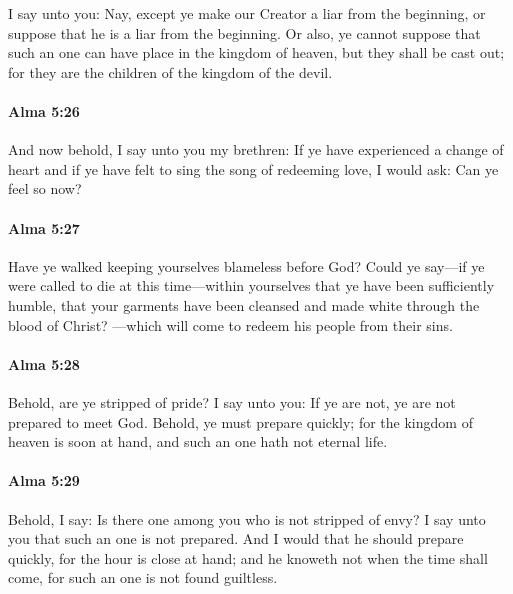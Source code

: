 			I say unto you:
			Nay, except ye make our Creator a liar from the beginning,
			or suppose that he is a liar from the beginning.
			Or also, ye cannot suppose
			that such an one can have place in the kingdom of heaven,
			but they shall be cast out;
			for they are the children of the kingdom of the devil.

		\paragraph{Alma 5:26} %
			\label{ALMA-5-26}

			And now behold, I say unto you my brethren:
			If ye have experienced a change of heart
			and if ye have felt to sing the song of redeeming love,
			I would ask:
			Can ye feel so now?

		\paragraph{Alma 5:27} %
			\label{ALMA-5-27}

			Have ye walked keeping yourselves blameless before God?
			Could ye say---if ye were called to die at this time---within yourselves
			that ye have been sufficiently humble,
			that your garments have been cleansed
			and made white through the blood of Christ?
			---which will come to redeem his people from their sins.

		\paragraph{Alma 5:28} %
			\label{ALMA-5-28}

			Behold, are ye stripped of pride?
			I say unto you:
			If ye are not, ye are not prepared to meet God.
			Behold, ye must prepare quickly;
			for the kingdom of heaven is soon at hand,
			and such an one hath not eternal life.

		\paragraph{Alma 5:29} %
			\label{ALMA-5-29}

			Behold, I say:
			Is there one among you who is not stripped of envy?
			I say unto you that such an one is not prepared.
			And I would that he should prepare quickly,
			for the hour is close at hand;
			and he knoweth not when the time shall come,
			for such an one is not found guiltless.

